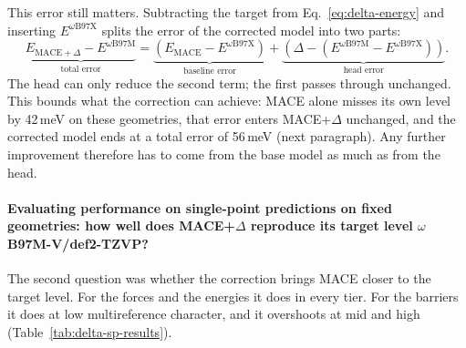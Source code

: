 This error still matters. Subtracting the target from Eq.~\eqref{eq:delta-energy} and
inserting $E^{\omega\text{B97X}}$ splits the error of the corrected model into
two parts:
\begin{equation}
\underbrace{E_{\text{MACE}+\Delta} - E^{\omega\text{B97M}}}_{\text{total error}}
=
\underbrace{\left(E_{\text{MACE}} - E^{\omega\text{B97X}}\right)}_{\text{baseline error}}
+
\underbrace{\left(\Delta - \left(E^{\omega\text{B97M}} - E^{\omega\text{B97X}}\right)\right)}_{\text{head error}} .
\label{eq:error-split}
\end{equation}
The head can only reduce the second term; the first passes through
unchanged. This bounds what the correction can achieve: MACE alone
misses its own level by 42\,meV on these geometries, that error
enters MACE+$\Delta$ unchanged, and the corrected model ends at a
total error of 56\,meV (next paragraph). Any further improvement
therefore has to come from the base model as much as from the head.


\paragraph{Evaluating performance on single-point predictions on fixed geometries: how well does MACE+$\Delta$ reproduce its target level $\omega$B97M-V/def2-TZVP?}
The second question was whether the correction brings MACE closer to the
target level. For the forces and the energies it does in every tier. For
the barriers it does at low multireference character, and it overshoots
at mid and high (Table~\ref{tab:delta-sp-results}).


